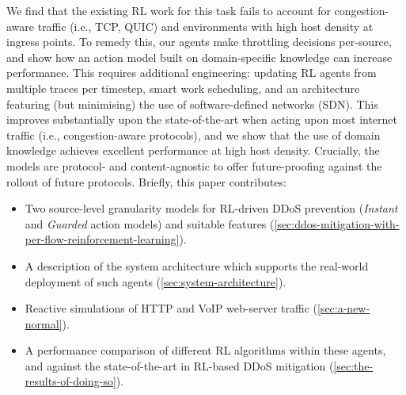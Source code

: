 \documentclass[10pt, times, conference, letterpaper]{IEEEtran}
\begin{document}
We find that the existing RL work for this task fails to account for congestion-aware traffic (i.e., TCP, QUIC) and environments with high host density at ingress points.
To remedy this, our agents make throttling decisions per-source, and show how an action model built on domain-specific knowledge can increase performance.
This requires additional engineering: updating RL agents from multiple traces per timestep, smart work scheduling, and an architecture featuring (but minimising) the use of software-defined networks (SDN).
This improves substantially upon the state-of-the-art when acting upon most internet traffic (i.e., congestion-aware protocols), and we show that the use of domain knowledge achieves excellent performance at high host density.
Crucially, the models are protocol- and content-agnostic to offer future-proofing against the rollout of future protocols.
Briefly, this paper contributes:
\begin{itemize}
	\item Two source-level granularity models for RL-driven DDoS prevention (\emph{Instant} and \emph{Guarded} action models) and suitable features (\cref{sec:ddos-mitigation-with-per-flow-reinforcement-learning}).
	\item A description of the system architecture which supports the real-world deployment of such agents (\cref{sec:system-architecture}).
	\item Reactive simulations of HTTP and VoIP web-server traffic (\cref{sec:a-new-normal}).
	\item A performance comparison of different RL algorithms within these agents, and against the state-of-the-art in RL-based DDoS mitigation (\cref{sec:the-results-of-doing-so}).
\end{itemize}
\end{document}
